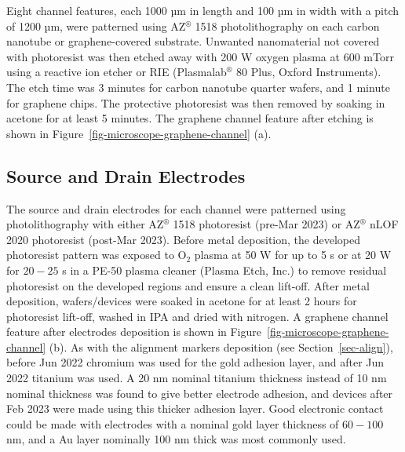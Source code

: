 \documentclass[
  a4paper,
]{scrbook}
\begin{document}
Eight channel features, each 1000 µm in length and 100 µm in width with
a pitch of 1200 µm, were patterned using AZ\(^\circledR\) 1518
photolithography on each carbon nanotube or graphene-covered substrate.
Unwanted nanomaterial not covered with photoresist was then etched away
with 200 W oxygen plasma at 600 mTorr using a reactive ion etcher or RIE
(Plasmalab\(^\circledR\) 80 Plus, Oxford Instruments). The etch time was
3 minutes for carbon nanotube quarter wafers, and 1 minute for graphene
chips. The protective photoresist was then removed by soaking in acetone
for at least 5 minutes. The graphene channel feature after etching is
shown in Figure~\ref{fig-microscope-graphene-channel} (a).

\hypertarget{sec-electrodes}{%
\subsection{Source and Drain Electrodes}\label{sec-electrodes}}

The source and drain electrodes for each channel were patterned using
photolithography with either AZ\(^\circledR\) 1518 photoresist (pre-Mar
2023) or AZ\(^\circledR\) nLOF 2020 photoresist (post-Mar 2023). Before
metal deposition, the developed photoresist pattern was exposed to
O\(_2\) plasma at 50 W for up to 5 s or at 20 W for \(20-25\) s in a
PE-50 plasma cleaner (Plasma Etch, Inc.) to remove residual photoresist
on the developed regions and ensure a clean lift-off. After metal
deposition, wafers/devices were soaked in acetone for at least 2 hours
for photoresist lift-off, washed in IPA and dried with nitrogen. A
graphene channel feature after electrodes deposition is shown in
Figure~\ref{fig-microscope-graphene-channel} (b). As with the alignment
markers deposition (see Section~\ref{sec-align}), before Jun 2022
chromium was used for the gold adhesion layer, and after Jun 2022
titanium was used. A 20 nm nominal titanium thickness instead of 10 nm
nominal thickness was found to give better electrode adhesion, and
devices after Feb 2023 were made using this thicker adhesion layer. Good
electronic contact could be made with electrodes with a nominal gold
layer thickness of \(60-100\) nm, and a Au layer nominally 100 nm thick
was most commonly used.
\end{document}

